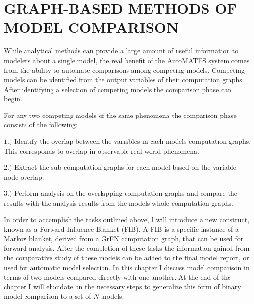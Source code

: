 \chapter{GRAPH-BASED METHODS OF MODEL COMPARISON\label{chapter:comparison}}

While analytical methods can provide a large amount of useful information to modelers about a single model, the real benefit of the AutoMATES system comes from the ability to automate comparisons among competing models. Competing models can be identified from the output variables of their computation graphs. After identifying a selection of competing models the comparison phase can begin.

For any two competing models of the same phenomena the comparison phase consists of the following:

$1.)$ Identify the overlap between the variables in each models computation graphs. This corresponds to overlap in observable real-world phenomena.

$2.)$ Extract the sub computation graphs for each model based on the variable node overlap.

$3.)$ Perform analysis on the overlapping computation graphs and compare the results with the analysis results from the models whole computation graphs.

In order to accomplish the tasks outlined above, I will introduce a new construct, known as a Forward Influence Blanket (FIB). A FIB is a specific instance of a Markov blanket, derived from a GrFN computation graph, that can be used for forward analysis.  %
After the completion of these tasks the information gained from the comparative study of these models can be added to the final model report, or used for automatic model selection. In this chapter I discuss model comparison in terms of two models compared directly with one another. At the end of the chapter I will elucidate on the necessary steps to generalize this form of binary model comparison to a set of $N$ models.

